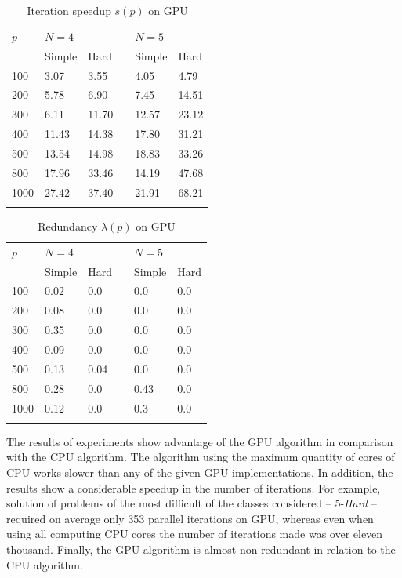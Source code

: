 \documentclass[smallcondensed]{svjour3}     %
\begin{document}
\begin{table}
	\caption{Iteration speedup $s(p)$ on GPU}
	\label{tab:last1}
	\center
	\begin{tabular}{llllll}
		\hline\noalign{\smallskip}
		$p$ & \multicolumn{2}{l}{ $N=4$ } & & \multicolumn{2}{l}{$N=5$} \\
		\noalign{\smallskip} \cline{2-3} \cline{5-6} \noalign{\smallskip}
		 & Simple & Hard & & Simple & Hard  \\
		\noalign{\smallskip} \hline \noalign{\smallskip}
		100	&	3.07	&	3.55	& &	4.05	&	4.79	\\
		200	&	5.78	&	6.90	& &	7.45	&	14.51	\\
		300	&	6.11	&	11.70	& &	12.57	&	23.12	\\
		400	&	11.43	&	14.38	& &	17.80	&	31.21	\\
		500	&	13.54	&	14.98	& &	18.83	&	33.26	\\
		800	&	17.96	&	33.46	& &	14.19	&	47.68	\\
		1000	&	27.42	&	37.40	& &	21.91	&	68.21	\\
		\noalign{\smallskip}\hline
	\end{tabular}
\end{table}


\begin{table}
	\caption{Redundancy $\lambda(p)$ on GPU}
	\label{tab:last}
	\center
	\begin{tabular}{llllll}
		\hline\noalign{\smallskip}
		$p$ & \multicolumn{2}{l}{ $N=4$ } & & \multicolumn{2}{l}{$N=5$} \\
		\noalign{\smallskip} \cline{2-3} \cline{5-6} \noalign{\smallskip}
		 & Simple & Hard & & Simple & Hard  \\
		\noalign{\smallskip} \hline \noalign{\smallskip}
		100 & 0.02 & 0.0 & & 0.0 & 0.0  \\
		200 & 0.08 & 0.0 & & 0.0 & 0.0  \\
		300 & 0.35 & 0.0 & & 0.0 & 0.0  \\
		400 & 0.09 & 0.0 & & 0.0 & 0.0  \\
		500 & 0.13 & 0.04 & & 0.0 & 0.0  \\
		800 & 0.28 & 0.0 & & 0.43 & 0.0  \\
		1000 & 0.12 & 0.0 & & 0.3 & 0.0  \\
		\noalign{\smallskip}\hline
	\end{tabular}
\end{table}

The results of experiments show advantage of the GPU algorithm in comparison with the CPU algorithm. The algorithm using the maximum quantity of cores of CPU works slower than any of the given GPU implementations. In addition, the results show a considerable speedup in the number of iterations. For example, solution of problems of the most difficult of the classes considered -- 5-\textit{Hard} -- required on average only 353 parallel iterations on GPU, whereas even when using all computing CPU cores the number of iterations made was over eleven thousand. Finally, the GPU algorithm is almost non-redundant in relation to the CPU algorithm.
\end{document}
